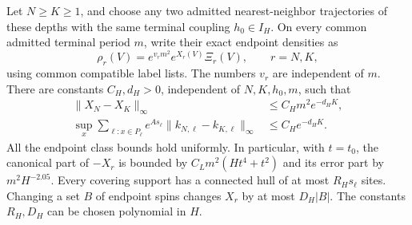\begin{theorem}
\label{rg:matching}\label{thm:matched-endpoint}
Let $N\ge K\ge1$, and choose any two admitted nearest-neighbor
trajectories of these depths with the same terminal coupling
$h_0\in I_H$.  On every common admitted terminal period $m$,
write their exact endpoint densities as
\[
 \rho_r(V)=e^{v_rm^2}e^{X_r(V)}\Xi_r(V),\qquad r=N,K,
\]
using common compatible label lists.  The numbers $v_r$ are
independent of $m$.  There are constants $C_H,d_H>0$,
independent of $N,K,h_0,m$, such that
\begin{align}
 \|X_N-X_K\|_\infty
       &\le C_Hm^2e^{-d_HK},\nonumber\\
 \sup_x\sum_{\ell:x\in P_\ell}
      e^{As_\ell}\|k_{N,\ell}-k_{K,\ell}\|_\infty
       &\le C_He^{-d_HK}.
 \label{rg:terminal-difference}
\end{align}
All the endpoint class bounds hold uniformly.  In particular,
with $t=t_0$, the canonical part of $-X_r$ is bounded by
$C_Lm^2(Ht^4+t^2)$ and its error part by $m^2H^{-2.05}$.
Every covering support has a connected hull of at most
$R_Hs_\ell$ sites.  Changing a set $B$ of endpoint spins
changes $X_r$ by at most $D_H|B|$.  The constants $R_H,D_H$
can be chosen polynomial in $H$.
\end{theorem}
